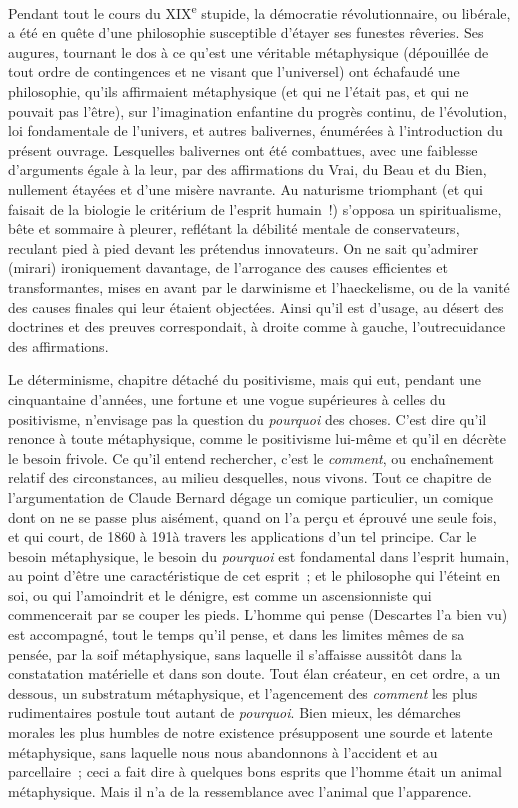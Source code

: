 \documentclass[french,twoside]{book} %
\begin{document}
Pendant tout le cours du XIX\textsuperscript{e} stupide, la démocratie révolutionnaire, ou libérale, a été en quête d’une philosophie susceptible d’étayer ses funestes rêveries. Ses augures, tournant le dos à ce qu’est une véritable métaphysique (dépouillée de tout ordre de contingences et ne visant que l’universel) ont échafaudé une philosophie, qu’ils affirmaient métaphysique (et qui ne l’était pas, et qui ne pouvait pas l’être), sur l’imagination enfantine du progrès continu, de l’évolution, loi fondamentale de l’univers, et autres balivernes, énumérées à l’introduction du présent ouvrage. Lesquelles balivernes ont été combattues, avec une faiblesse d’arguments égale à la leur, par des affirmations du Vrai, du Beau et du Bien, nullement étayées et d’une misère navrante. Au naturisme triomphant (et qui faisait de la biologie le critérium de l’esprit humain !) s’opposa un spiritualisme, bête et sommaire à pleurer, reflétant la débilité mentale de conservateurs, reculant pied à pied devant les prétendus innovateurs. On ne sait qu’admirer (mirari) ironiquement davantage, de l’arrogance des causes efficientes et transformantes, mises en avant par le darwinisme et l’haeckelisme, ou de la vanité des causes finales qui leur étaient objectées. Ainsi qu’il est d’usage, au désert des doctrines et des preuves correspondait, à droite comme à gauche, l’outrecuidance des affirmations.\par
Le déterminisme, chapitre détaché du positivisme, mais qui eut, pendant une cinquantaine d’années, une fortune et une vogue supérieures à celles du positivisme, n’envisage pas la question du {\itshape pourquoi} des choses. C’est dire qu’il renonce à toute métaphysique, comme le positivisme lui-même et qu’il en décrète le besoin frivole. Ce qu’il entend rechercher, c’est le {\itshape comment}, ou enchaînement relatif des circonstances, au milieu desquelles, nous vivons. Tout ce chapitre de l’argumentation de Claude Bernard dégage un comique particulier, un comique dont on ne se passe plus aisément, quand on l’a perçu et éprouvé une seule fois, et qui court, de 1860 à 191à travers les applications d’un tel principe. Car le besoin métaphysique, le besoin du {\itshape pourquoi} est fondamental dans l’esprit humain, au point d’être une caractéristique de cet esprit ; et le philosophe qui l’éteint en soi, ou qui l’amoindrit et le dénigre, est comme un ascensionniste qui commencerait par se couper les pieds. L’homme qui pense (Descartes l’a bien vu) est accompagné, tout le temps qu’il pense, et dans les limites mêmes de sa pensée, par la soif métaphysique, sans laquelle il s’affaisse aussitôt dans la constatation matérielle et dans son doute. Tout élan créateur, en cet ordre, a un dessous, un substratum métaphysique, et l’agencement des {\itshape comment} les plus rudimentaires postule tout autant de {\itshape pourquoi}. Bien mieux, les démarches morales les plus humbles de notre existence présupposent une sourde et latente métaphysique, sans laquelle nous nous abandonnons à l’accident et au parcellaire ; ceci a fait dire à quelques bons esprits que l’homme était un animal métaphysique. Mais il n’a de la ressemblance avec l’animal que l’apparence.\par
\end{document}
